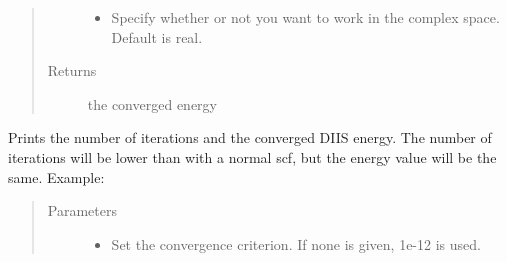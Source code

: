 \documentclass[letterpaper,10pt,english]{sphinxmanual}
\begin{document}
\begin{fulllineitems}
\begin{fulllineitems}
\begin{quote}
\begin{description}
\begin{itemize}
\item {} 
 \textendash{} Specify whether or not you want to work in the complex space. Default is real.

\end{itemize}

\item[{Returns}] \leavevmode
the converged energy

\end{description}\end{quote}

\end{fulllineitems}


\begin{fulllineitems}
\label{\detokenize{RHF:hf.RHF.RHF.get_scf_solution_diis}}
Prints the number of iterations and the converged DIIS energy. The number of iterations will be lower than with
a normal scf, but the energy value will be the same. Example:

\begin{sphinxVerbatim}[commandchars=\\\{\}]
       
   
\end{sphinxVerbatim}
\begin{quote}\begin{description}
\item[{Parameters}] \leavevmode\begin{itemize}
\item {} 
 \textendash{} Set the convergence criterion. If none is given, 1e-12 is used.


\end{itemize}
\end{description}
\end{quote}
\end{fulllineitems}
\end{fulllineitems}
\end{document}
